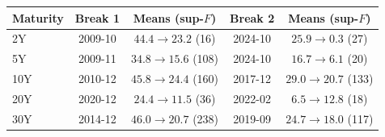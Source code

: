 \begin{tabular}{lcccc}
\toprule
Maturity & Break 1 & Means (sup-$F$) & Break 2 & Means (sup-$F$) \\
\midrule
2Y & 2009-10 & $44.4\to23.2$ (16) & 2024-10 & $25.9\to0.3$ (27) \\
5Y & 2009-11 & $34.8\to15.6$ (108) & 2024-10 & $16.7\to6.1$ (20) \\
10Y & 2010-12 & $45.8\to24.4$ (160) & 2017-12 & $29.0\to20.7$ (133) \\
20Y & 2020-12 & $24.4\to11.5$ (36) & 2022-02 & $6.5\to12.8$ (18) \\
30Y & 2014-12 & $46.0\to20.7$ (238) & 2019-09 & $24.7\to18.0$ (117) \\
\bottomrule
\end{tabular}
